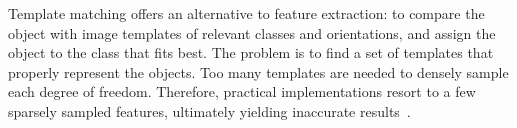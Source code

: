 
Template matching offers an alternative to feature extraction: to compare the object with image templates of relevant classes and orientations, and assign the object to the class that fits best. The problem is to find a set of templates that properly represent the objects. Too many templates are needed to densely sample each degree of freedom. Therefore, practical implementations resort to a few sparsely sampled features, ultimately yielding inaccurate results~\cite{Midelfart2010}.

%
%
%
%










